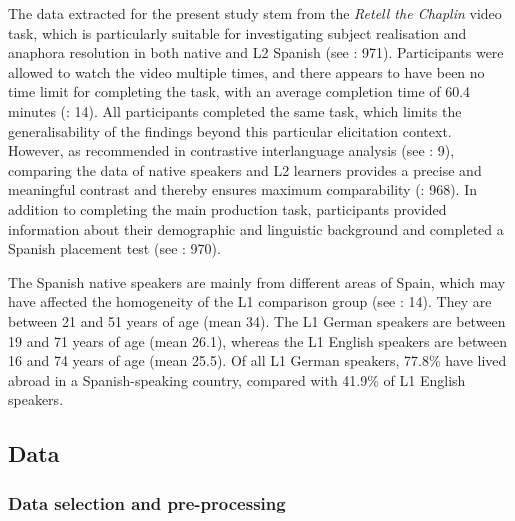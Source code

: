 \documentclass[
  letterpaper,
  DIV=11,
  numbers=noendperiod]{scrartcl}
\begin{document}
The data extracted for the present study stem from the \emph{Retell the
Chaplin} video task, which is particularly suitable for investigating
subject realisation and anaphora resolution in both native and L2
Spanish (see : 971).
Participants were allowed to watch the video multiple times, and there
appears to have been no time limit for completing the task, with an
average completion time of 60.4 minutes
(: 14). All participants
completed the same task, which limits the generalisability of the
findings beyond this particular elicitation context. However, as
recommended in contrastive interlanguage analysis (see
: 9), comparing the data of
native speakers and L2 learners provides a precise and meaningful
contrast and thereby ensures maximum comparability
(: 968). In addition to
completing the main production task, participants provided information
about their demographic and linguistic background and completed a
Spanish placement test (see : 970).

The Spanish native speakers are mainly from different areas of Spain,
which may have affected the homogeneity of the L1 comparison group (see
: 14). They are between
21 and 51 years of age (mean 34). The L1 German speakers are between 19
and 71 years of age (mean 26.1), whereas the L1 English speakers are
between 16 and 74 years of age (mean 25.5). Of all L1 German speakers,
77.8\% have lived abroad in a Spanish-speaking country, compared with
41.9\% of L1 English speakers.

\subsection{Data}\label{data}

\subsubsection{Data selection and
pre-processing}\label{sec-data-selection-prerocessing}
\end{document}

